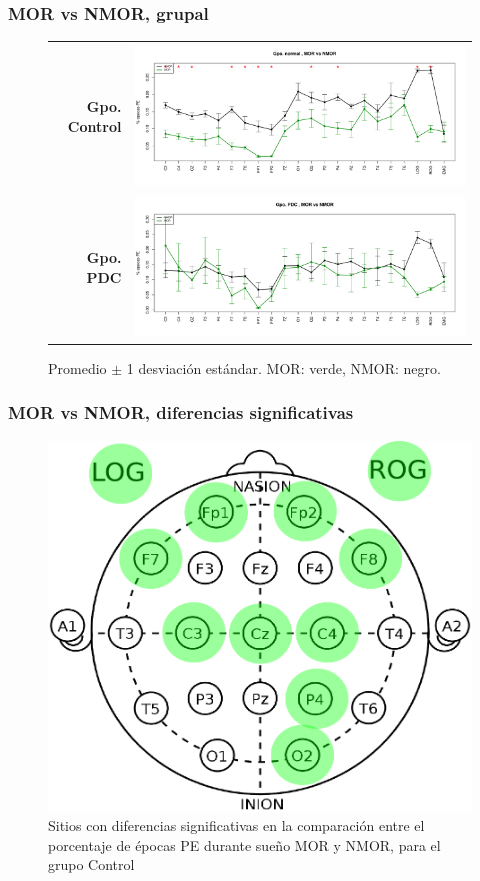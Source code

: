 \documentclass{beamer}
\begin{document}

\begin{frame}\frametitle{MOR vs NMOR, grupal}
\begin{figure}
\centering
\begin{tabular}{rl}
{\Large \textbf{Gpo. Control}}
&
\includegraphics[width=0.6\linewidth]
{./new170424/comp_etapas_gpos_NORMALMOR_vs_NMOR.pdf} 
\\
{\Large \textbf{Gpo. PDC}}
&
\includegraphics[width=0.6\linewidth]
{./new170424/comp_etapas_gpos_PDCMOR_vs_NMOR.pdf} 
\end{tabular}
\caption{ Promedio $\pm$ 1 desviaci\'on est\'andar. MOR: verde, NMOR: negro.}
\end{figure}
\end{frame}


\begin{frame}\frametitle{MOR vs NMOR, diferencias significativas}
\begin{figure}
\centering
\includegraphics[width=0.4\linewidth]
{cabecita.pdf} 
\caption{Sitios con diferencias 
significativas en la comparaci\'on entre el porcentaje de \'epocas PE durante sue\~no MOR y NMOR, 
para el grupo Control}
\end{figure}
\end{frame}
\end{document}
